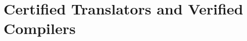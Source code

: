 \section{Certified Translators and Verified Compilers}
\label{sec:certified-translators-verified-compilers}

